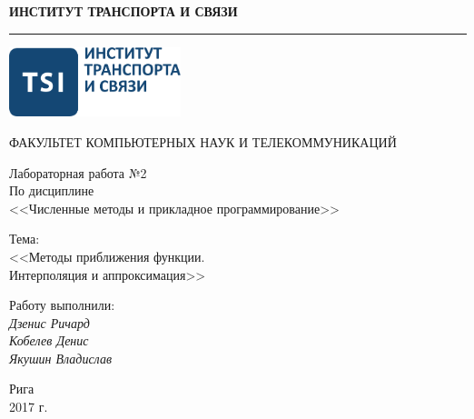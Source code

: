 \documentclass[a4paper]{article}
\begin{document}
% 
\begin{titlepage}
    \begin{center}
        \setlength{\parindent}{0cm}
        \fontsize{16pt}{16pt}\selectfont

        \textbf{ИНСТИТУТ ТРАНСПОРТА И СВЯЗИ}

        \rule{\textwidth}{1pt}

        \vspace*{2.0cm}

        \includegraphics[width=5cm]{../../tsi_logo}

        \vspace*{2.0cm}

        ФАКУЛЬТЕТ КОМПЬЮТЕРНЫХ НАУК И ТЕЛЕКОММУНИКАЦИЙ

        \vspace*{2.0cm}

        Лабораторная работа №2 \\
        По дисциплине \\
        <<Численные методы и прикладное программирование>>

        \vspace*{2.0cm}
        \fontsize{14pt}{14pt}\selectfont
        Тема: \\
        <<Методы приближения функции. \\ Интерполяция и аппроксимация>>

        \vfill
        \fontsize{12pt}{12pt}\selectfont

        \begin{flushright}
            Работу выполнили: \\
            \vspace*{0.25cm}
            {\itshape Дзенис Ричард} \\
            {\itshape Кобелев Денис} \\
            {\itshape Якушин Владислав} \\
        \end{flushright}

        \vfill

        Рига \\ 2017 г.
    \end{center}
\end{titlepage}
\end{document}
